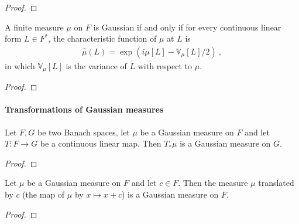 \begin{proof}\leanok

\end{proof}


\begin{theorem}\label{thm:isGaussian_iff_charFunDual_eq}
  \mathlibok
A finite measure $\mu$ on $F$ is Gaussian if and only if for every continuous linear form $L \in F^*$, the characteristic function of $\mu$ at $L$ is
\begin{align*}
  \hat{\mu}(L) = \exp\left(i \mu[L] - \mathbb{V}_\mu[L] / 2\right) \: ,
\end{align*}
in which $\mathbb{V}_\mu[L]$ is the variance of $L$ with respect to $\mu$.
\end{theorem}

\begin{proof}\leanok

\end{proof}



\paragraph{Transformations of Gaussian measures}

\begin{lemma}\label{lem:isGaussian_map}
  \mathlibok
Let $F, G$ be two Banach spaces, let $\mu$ be a Gaussian measure on $F$ and let $T : F \to G$ be a continuous linear map.
Then $T_*\mu$ is a Gaussian measure on $G$.
\end{lemma}

\begin{proof}\leanok

\end{proof}


\begin{lemma}\label{lem:isGaussian_add_const}
  \leanok
Let $\mu$ be a Gaussian measure on $F$ and let $c \in F$.
Then the measure $\mu$ translated by $c$ (the map of $\mu$ by $x \mapsto x + c$) is a Gaussian measure on $F$.
\end{lemma}

\begin{proof}\leanok

\end{proof}


